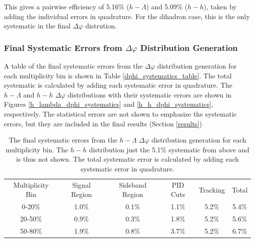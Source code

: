 \documentclass[ALICE,manyauthors]{ALICE_analysis_notes}
\begin{document}
This gives a pairwise efficiency of 5.16\% ($h-\Lambda$) and 5.09\% ($h-h$), taken by adding the individual errors in quadrature. For the dihadron case, this is the only systematic in the final $\Delta\varphi$ distrution.

\subsubsection{Final Systematic Errors from $\Delta\varphi$ Distribution Generation}
A table of the final systematic errors from the $\Delta\varphi$ distribution generation for each multiplicity bin is shown in Table \ref{dphi_systematics_table}. The total systematic is calculated by adding each systematic error in quadrature. The $h-\Lambda$ and $h-h$ $\Delta\varphi$ distributions with their systematic errors are shown in Figures \ref{h_lambda_dphi_systematics} and \ref{h_h_dphi_systematics}, respectively. The statistical errors are not shown to emphasize the systematic errors, but they are included in the final results (Section \ref{results})


\begin{table}[ht]
\centering
\begin{tabular}{|c|c|c|c|c||c|}
\hline
Multiplicity Bin & Signal Region & Sideband Region & PID Cuts & Tracking & Total \\
0-20\% & 1.0\% & 0.1\% & 1.1\% & 5.2\% & 5.4\% \\
20-50\% & 0.9\% & 0.3\% & 1.8\% & 5.2\% & 5.6\% \\
50-80\% & 1.9\% & 0.8\% & 3.7\% & 5.2\% & 6.7\% \\
\hline
\end{tabular}
\caption{The final systematic errors from the $h-\Lambda$ $\Delta\varphi$ distribution generation for each multiplicity bin. The $h-h$ distribution just the 5.1\% systematic from above and is thus not shown. The total systematic error is calculated by adding each systematic error in quadrature.}
\end{table}
\end{document}
